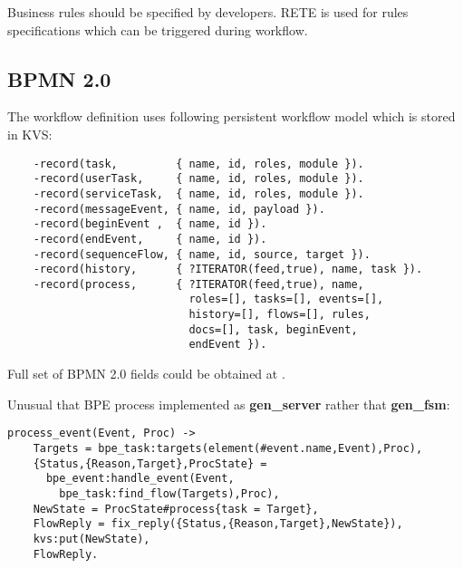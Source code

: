 Business rules should be specified by developers.
RETE is used for rules specifications which can be triggered during workflow.

\newpage

\subsection{BPMN 2.0}

The workflow definition uses following persistent workflow model which is stored in KVS:

\vspace{1\baselineskip}
\begin{lstlisting}
    -record(task,         { name, id, roles, module }).
    -record(userTask,     { name, id, roles, module }).
    -record(serviceTask,  { name, id, roles, module }).
    -record(messageEvent, { name, id, payload }).
    -record(beginEvent ,  { name, id }).
    -record(endEvent,     { name, id }).
    -record(sequenceFlow, { name, id, source, target }).
    -record(history,      { ?ITERATOR(feed,true), name, task }).
    -record(process,      { ?ITERATOR(feed,true), name,
                            roles=[], tasks=[], events=[],
                            history=[], flows=[], rules,
                            docs=[], task, beginEvent,
                            endEvent }).
\end{lstlisting}

Full set of BPMN 2.0 fields could be obtained at .

Unusual that BPE process implemented as {\bf gen\_server} rather
that {\bf gen\_fsm}:

\vspace{1\baselineskip}
\begin{lstlisting}[caption=Boundary Event]
  process_event(Event, Proc) ->
    Targets = bpe_task:targets(element(#event.name,Event),Proc),
    {Status,{Reason,Target},ProcState} =
      bpe_event:handle_event(Event,
        bpe_task:find_flow(Targets),Proc),
    NewState = ProcState#process{task = Target},
    FlowReply = fix_reply({Status,{Reason,Target},NewState}),
    kvs:put(NewState),
    FlowReply.
\end{lstlisting}


